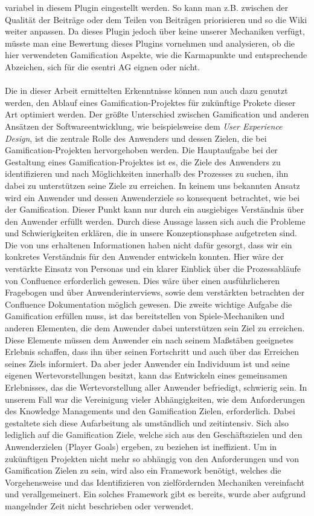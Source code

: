 \documentclass[a4paper,12pt,twoside]{scrartcl}
\begin{document}
variabel in diesem Plugin eingestellt werden. So kann man z.B. zwischen der Qualität der Beiträge oder dem Teilen von Beiträgen priorisieren und so die Wiki weiter anpassen. Da dieses Plugin jedoch über keine unserer Mechaniken verfügt, müsste man eine Bewertung dieses Plugins vornehmen und analysieren, ob die hier verwendeten Gamification Aspekte, wie die Karmapunkte und entsprechende Abzeichen, sich für die esentri AG eignen oder nicht.
\\\\
Die in dieser Arbeit ermittelten Erkenntnisse können nun auch dazu genutzt werden, den Ablauf eines Gamification-Projektes für zukünftige Prokete dieser Art optimiert werden. Der größte Unterschied zwischen Gamification und anderen Ansätzen der Softwareentwicklung, wie beispielsweise dem \textit{User Experience Design}, ist die zentrale Rolle des Anwenders und dessen Zielen, die bei Gamification-Projekten hervorgehoben werden. Die Hauptaufgabe bei der Gestaltung eines Gamification-Projektes ist es, die Ziele des Anwenders zu identifizieren und nach Möglichkeiten innerhalb des Prozesses zu suchen, ihn dabei zu unterstützen seine Ziele zu erreichen. In keinem uns bekannten Ansatz wird ein Anwender und dessen Anwenderziele so konsequent betrachtet, wie bei der Gamification. Dieser Punkt kann nur durch ein ausgiebiges Verständnis über den Anwender erfüllt werden. Durch diese Aussage lassen sich auch die Probleme und Schwierigkeiten erklären, die in unsere Konzeptionsphase aufgetreten sind. Die von uns erhaltenen Informationen haben nicht dafür gesorgt, dass wir ein konkretes Verständnis für den Anwender entwickeln konnten. Hier wäre der verstärkte Einsatz von Personas und ein klarer Einblick über die Prozessabläufe von Confluence erforderlich gewesen. Dies wäre über einen ausführlicheren Fragebogen und über Anwenderinterviews, sowie dem verstärkten betrachten der Confluence Dokumentation möglich gewesen. Die zweite wichtige Aufgabe die Gamification erfüllen muss, ist das bereitstellen von Spiele-Mechaniken und anderen Elementen, die dem Anwender dabei unterstützen sein Ziel zu erreichen. Diese Elemente müssen dem Anwender ein nach seinem Maßstäben geeignetes Erlebnis schaffen, dass ihn über seinen Fortschritt und auch über das Erreichen seines Ziels informiert. Da aber jeder Anwender ein Individuum ist und seine eigenen Wertevorstellungen besitzt, kann das Entwickeln eines gemeinsamen Erlebnisses, das die Wertevorstellung aller Anwender befriedigt, schwierig sein. In unserem Fall war die Vereinigung vieler Abhängigkeiten, wie dem Anforderungen des Knowledge Managements und den Gamification Zielen, erforderlich. Dabei gestaltete sich diese Aufarbeitung als umständlich und zeitintensiv. Sich also lediglich auf die Gamification Ziele, welche sich aus den Geschäftszielen und den Anwenderzielen (Player Goals) ergeben, zu beziehen ist ineffizient. Um in zukünftigen Projekten nicht mehr so abhängig von den Anforderungen und von Gamification Zielen zu sein, wird also ein Framework benötigt, welches die Vorgehensweise und das Identifizieren von zielfördernden Mechaniken vereinfacht und verallgemeinert. Ein solches Framework gibt es bereits, wurde aber aufgrund mangelnder Zeit nicht beschrieben oder verwendet. 
\end{document}
